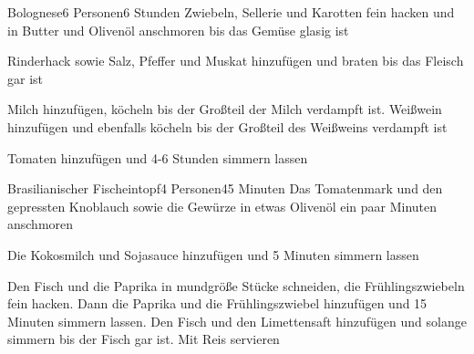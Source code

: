 
\begin{recipe}{Bolognese}{6 Personen}{6 Stunden}
Zwiebeln, Sellerie und Karotten fein hacken und  in Butter und Olivenöl anschmoren bis das Gemüse glasig ist

Rinderhack sowie Salz, Pfeffer und Muskat hinzufügen und braten bis das Fleisch gar ist

Milch hinzufügen, köcheln bis der Großteil der Milch verdampft ist.
Weißwein hinzufügen und ebenfalls köcheln bis der Großteil des Weißweins verdampft ist

Tomaten hinzufügen und 4-6 Stunden simmern lassen
\end{recipe}


\begin{recipe}{Brasilianischer Fischeintopf}{4 Personen}{45 Minuten}
Das Tomatenmark und den gepressten Knoblauch sowie die Gewürze in etwas Olivenöl ein paar Minuten anschmoren

Die Kokosmilch und Sojasauce hinzufügen und 5 Minuten simmern lassen

Den Fisch und die Paprika in mundgröße Stücke schneiden, die Frühlingszwiebeln fein hacken.
Dann die Paprika und die Frühlingszwiebel hinzufügen und 15 Minuten simmern lassen.
Den Fisch und den Limettensaft hinzufügen und solange simmern bis der Fisch gar ist.
Mit Reis servieren
\end{recipe}


